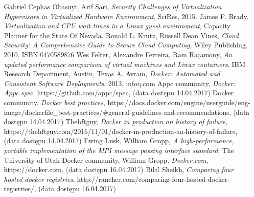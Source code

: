 \documentclass[10pt,a4paper,titlepage,twoside]{report}
\begin{document}
\begin{thebibliography}{99}
Gabriel Cephas Obasuyi, Arif Sari, \textit{Security Challenges of Virtualization Hypervisors in Virtualized Hardware Environment}, SciRes, 2015.
James F. Brady, \textit{Virtualization and CPU wait times in a Linux guest environment}, Capacity Planner for the State Of Nevada.
Ronald L. Krutz, Russell Dean Vines, \textit{Cloud Security: A Comprehensive Guide to Secure Cloud Computing}, Wiley Publishing, 2010, ISBN:0470589876
Wes Felter, Alexandre Ferreira, Ram Rajamony, \textit{An updated performance comparison of virtual machines and Linux containers}, IBM Research Department, Austin, Texas
A. Avram, \textit{Docker: Automated and Consistent Software Deployments}, 2013, infoq.com
Appc community, \textit{Docker: Appc spec}, https://github.com/appc/spec, (data dostępu 14.04.2017)
Docker community, \textit{Docker best practices}, https://docs.docker.com/engine/userguide/eng-image/dockerfile\_best-practices/\#general-guidelines-and-recommendations, (data dostępu 14.04.2017)
Thehftguy, \textit{Docker in production an history of failure}, https://thehftguy.com/2016/11/01/docker-in-production-an-history-of-failure, (data dostępu 14.04.2017)
Ewing Lusk, William Gropp, \textit{A high-performance, portable implementation of the MPI message passing interface standard}, The University of Utah
Docker community, William Gropp, \textit{Docker.com}, https://docker.com, (data dostępu 16.04.2017)
Bilal Sheikh, \textit{Comparing four hosted docker registries}, http://rancher.com/comparing-four-hosted-docker-registries/, (data dostępu 16.04.2017)

\end{thebibliography}

\end{document}
